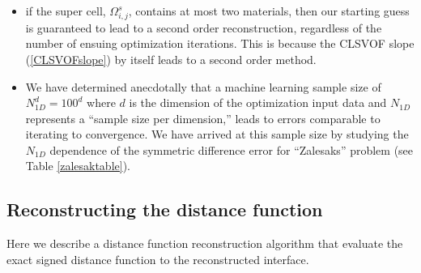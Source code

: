\documentclass[]{article}
\newcommand{\bmx}{\mbox{\boldmath $x$\unboldmath}}
\begin{document}
\begin{enumerate}
\begin{itemize}
    (i.e. ``unreconstructed'') region of
    $\Omega_{i,j}^s$.  For the first cut,  
    $\bmx_{uncapt}$ is the centroid of 
    $\Omega_{i,j}^s$ 
    (\ref{eq:super_cell_def}).
   \item if the super cell, $\Omega_{i,j}^s$, contains at most two
    materials, then our starting guess is guaranteed to lead to a 
    second order reconstruction, regardless of the number of ensuing 
    optimization iterations.  This is because the CLSVOF slope
    (\ref{CLSVOFslope}) by 
    itself leads to a second order method.  
   \item We have determined 
    anecdotally that a machine learning sample size of 
    $N_{1D}^{d}=100^{d}$
    where $d$ is the dimension of the optimization input data and 
    $N_{1D}$ represents a ``sample size per dimension,'' leads
    to errors comparable to iterating to convergence.  We have 
    arrived at this sample size by 
    studying the $N_{1D}$ dependence
    of the symmetric difference error for ``Zalesaks'' problem 
    (see Table \ref{zalesaktable}).
   \end{itemize}
\end{enumerate}


\subsection{Reconstructing the distance function \label{MMRECON}}
Here we describe a distance function reconstruction algorithm that evaluate the exact signed distance function to the reconstructed interface.
\end{document}
